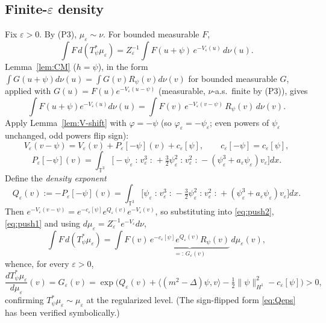 \documentclass[12pt]{article}
\newcommand{\bT}{\mathbb{T}}
\newcommand{\eps}{\varepsilon}
\newcommand{\Wick}[1]{\mathopen{:}#1\mathclose{:}}
\theoremstyle{plain}
\theoremstyle{definition}
\begin{document}
\subsection{Finite-$\eps$ density}
Fix $\eps>0$. By (P3), $\mu_\eps\sim\nu$. For bounded measurable $F$,
\begin{equation}\label{eq:push1}
\int F\,d(T_\psi^*\mu_\eps)=Z_\eps^{-1}\int F(u+\psi)\,e^{-V_\eps(u)}\,d\nu(u).
\end{equation}
Lemma~\ref{lem:CM} ($h=\psi$), in the form $\int G(u+\psi)d\nu(u)=\int G(v)R_\psi(v)d\nu(v)$
for bounded measurable $G$, applied with $G(u)=F(u)e^{-V_\eps(u-\psi)}$ (measurable,
$\nu$-a.s.\ finite by (P3)), gives
\begin{equation}\label{eq:push2}
\int F(u+\psi)e^{-V_\eps(u)}d\nu(u)=\int F(v)\,e^{-V_\eps(v-\psi)}\,R_\psi(v)\,d\nu(v).
\end{equation}
Apply Lemma~\ref{lem:V-shift} with $\varphi=-\psi$ (so $\varphi_\eps=-\psi_\eps$;
even powers of $\psi_\eps$ unchanged, odd powers flip sign):
\begin{equation}\label{eq:V-shift-neg}
V_\eps(v-\psi)=V_\eps(v)+P_\eps[-\psi](v)+c_\eps[\psi],\qquad
c_\eps[-\psi]=c_\eps[\psi],
\end{equation}
\begin{equation}\label{eq:Pneg}
P_\eps[-\psi](v)=\int_{\bT^3}\Big[-\psi_\eps\Wick{v_\eps^3}+\tfrac32\psi_\eps^2\Wick{v_\eps^2}
-(\psi_\eps^3+a_\eps\psi_\eps)v_\eps\Big]dx .
\end{equation}
Define the \emph{density exponent}
\begin{equation}\label{eq:Qeps}
Q_\eps(v):=-P_\eps[-\psi](v)
=\int_{\bT^3}\Big[\psi_\eps\Wick{v_\eps^3}-\tfrac32\psi_\eps^2\Wick{v_\eps^2}
+(\psi_\eps^3+a_\eps\psi_\eps)v_\eps\Big]dx .
\end{equation}
Then $e^{-V_\eps(v-\psi)}=e^{-c_\eps[\psi]}e^{Q_\eps(v)}e^{-V_\eps(v)}$, so
substituting into \eqref{eq:push2}, \eqref{eq:push1} and using
$d\mu_\eps=Z_\eps^{-1}e^{-V_\eps}d\nu$,
\begin{equation}\label{eq:density-eps}
\int F\,d(T_\psi^*\mu_\eps)=\int F(v)\,
\underbrace{e^{-c_\eps[\psi]}e^{Q_\eps(v)}R_\psi(v)}_{=:\,G_\eps(v)}\,d\mu_\eps(v),
\end{equation}
whence, for every $\eps>0$,
\begin{equation}\label{eq:RN-eps}
\frac{dT_\psi^*\mu_\eps}{d\mu_\eps}(v)=G_\eps(v)
=\exp\Big(Q_\eps(v)+\langle(m^2-\Delta)\psi,v\rangle-\tfrac12\|\psi\|_{H^1}^2-c_\eps[\psi]\Big)>0,
\end{equation}
confirming $T_\psi^*\mu_\eps\sim\mu_\eps$ at the regularized level. (The
sign-flipped form \eqref{eq:Qeps} has been verified symbolically.)
\end{document}
